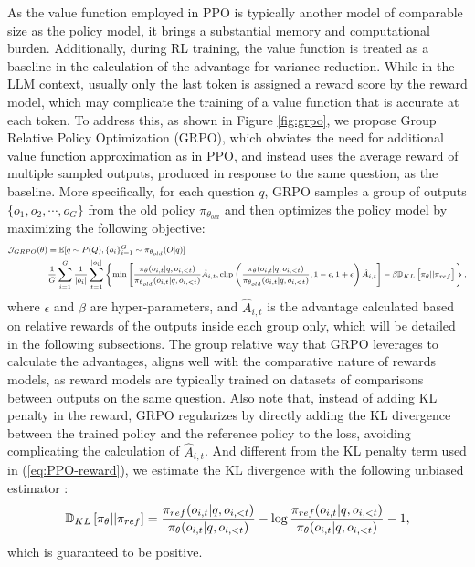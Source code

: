 As the value function employed in PPO is typically another model of comparable size as the policy model, it brings a substantial memory and computational burden. Additionally, during RL training, the value function is treated as a baseline in the calculation of the advantage for variance reduction. While in the LLM context, usually only the last token is assigned a reward score by the reward model, which may complicate the training of a value function that is accurate at each token. To address this, as shown in Figure \ref{fig:grpo}, we propose Group Relative Policy Optimization (GRPO), which obviates the need for additional value function approximation as in PPO, and instead uses the average reward of multiple sampled outputs, produced in response to the same question, as the baseline. More specifically, for each question $q$, GRPO samples a group of outputs $\{o_1, o_2, \cdots, o_G\}$  from the old policy  $\pi_{\theta_{old}}$  and then optimizes the policy model by maximizing the following objective:
\begin{equation}
\footnotesize
\begin{split}
    \mathcal{J}_{GRPO}(\theta) &= \mathbb{E}{[q \sim P(Q), \{o_i\}_{i=1}^G \sim \pi_{\theta_{old}}(O|q)]}  \\
    & \frac{1}{G}\sum_{i=1}^G\frac{1}{|o_i|} \sum_{t=1}^{|o_i|} \left\{ \min \left[ \frac{\pi_\theta(o_{i,t} | q, o_{i,<t})}{\pi_{\theta_{old}}(o_{i,t} | q, o_{i,<t})} \hat{A}_{i,t}, \text{clip} \left( \frac{\pi_\theta(o_{i,t} | q, o_{i,<t})}{\pi_{\theta_{old}}(o_{i,t} | q, o_{i,<t})}, 1 - \epsilon, 1 + \epsilon \right)  \hat{A}_{i,t} \right] - \beta \mathbb{D}_{KL}\left[\pi_{\theta} || \pi_{ref}\right]\right\} ,
\end{split}
\label{eq:GRPO-obj}
\end{equation}
where $\epsilon$ and $\beta$ are hyper-parameters, and $\hat{A}_{i,t}$  is the advantage calculated based on relative rewards of the outputs inside each group only, which will be detailed in the following subsections. The group relative way that GRPO leverages to calculate the advantages, aligns well with the comparative nature of rewards models,  as reward models are typically trained on datasets of comparisons between outputs on the same question. Also note that, instead of adding KL penalty in the reward, GRPO regularizes by directly adding the KL divergence between the trained policy and the reference policy to the loss, avoiding complicating the calculation of  $\hat{A}_{i,t}$. And different from the KL penalty term used in (\ref{eq:PPO-reward}), we estimate the KL divergence with the following unbiased estimator \citep{kl_approx}: 
\begin{equation}
\small
    \mathbb{D}_{KL}\left[\pi_{\theta} || \pi_{ref}\right] = \frac{\pi_{ref}(o_{i,t}|q,o_{i,<t})}{\pi_{\theta}(o_{i,t}|q,o_{i,<t})}- \log\frac{\pi_{ref}(o_{i,t}|q,o_{i,<t})}{\pi_{\theta}(o_{i,t}|q,o_{i,<t})} - 1,
\end{equation}
which is guaranteed to be positive. 


